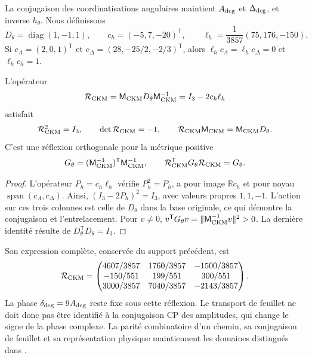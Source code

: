 La conjugaison des coordinatisations angulaires maintient \(A_{\rm deg}\) et
\(\Delta_{\rm deg}\), et inverse \(h_\theta\). Nous définissons
\begin{equation}
 D_\theta=\operatorname{diag}(1,-1,1),\qquad
 c_h=(-5,7,-20)^{\mathsf T},\qquad
 \ell_h=\frac1{3857}(75,176,-150).
 \label{eq:ii-ckm-sheet-data}
\end{equation}
Si \(c_A=(2,0,1)^{\mathsf T}\) et
\(c_\Delta=(28,-25/2,-2/3)^{\mathsf T}\), alors
\(\ell_hc_A=\ell_hc_\Delta=0\) et \(\ell_hc_h=1\).

\begin{theorem}
L'opérateur
\begin{equation}
 \mathcal R_{\rm CKM}
 =\mathsf M_{\rm CKM}D_\theta\mathsf M_{\rm CKM}^{-1}
 =I_3-2c_h\ell_h
 \label{eq:ii-ckm-reflection}
\end{equation}
satisfait
\begin{equation}
 \mathcal R_{\rm CKM}^2=I_3,\qquad
 \det\mathcal R_{\rm CKM}=-1,\qquad
 \mathcal R_{\rm CKM}\mathsf M_{\rm CKM}
 =\mathsf M_{\rm CKM}D_\theta.
 \label{eq:ii-ckm-intertwining}
\end{equation}
C'est une réflexion orthogonale pour la métrique positive
\begin{equation}
 G_\theta=(\mathsf M_{\rm CKM}^{-1})^{\mathsf T}
                 \mathsf M_{\rm CKM}^{-1},\qquad
 \mathcal R_{\rm CKM}^{\mathsf T}G_\theta\mathcal R_{\rm CKM}=G_\theta.
 \label{eq:ii-ckm-metric}
\end{equation}
\end{theorem}

\begin{proof}
L'opérateur \(P_h=c_h\ell_h\) vérifie \(P_h^2=P_h\), a pour image
\(\mathbb Rc_h\) et pour noyau \(\operatorname{span}(c_A,c_\Delta)\).
Ainsi, \((I_3-2P_h)^2=I_3\), avec valeurs propres \(1,1,-1\).
L'action sur ces trois colonnes est celle de \(D_\theta\) dans la base
originale, ce qui démontre la conjugaison et l'entrelacement.
Pour \(v\ne0\),
\(v^{\mathsf T}G_\theta v=\|\mathsf M_{\rm CKM}^{-1}v\|^2>0\).
La dernière identité résulte de \(D_\theta^{\mathsf T}D_\theta=I_3\).
\end{proof}

Son expression complète, conservée du support précédent, est
\begin{equation}
 \mathcal R_{\rm CKM}=
 \begin{pmatrix}
 4607/3857&1760/3857&-1500/3857\\
 -150/551&199/551&300/551\\
 3000/3857&7040/3857&-2143/3857
 \end{pmatrix}.
 \label{eq:ii-ckm-reflection-matrix}
\end{equation}
La phase \(\delta_{\rm deg}=9A_{\rm deg}\) reste fixe sous cette
réflexion. Le transport de feuillet ne doit donc pas être identifié
à la conjugaison CP des amplitudes, qui change le signe de la phase complexe.
La parité combinatoire d'un chemin, sa conjugaison de feuillet et sa
représentation physique maintiennent les domaines distingués dans
\cite{cpt,mezcla}.

